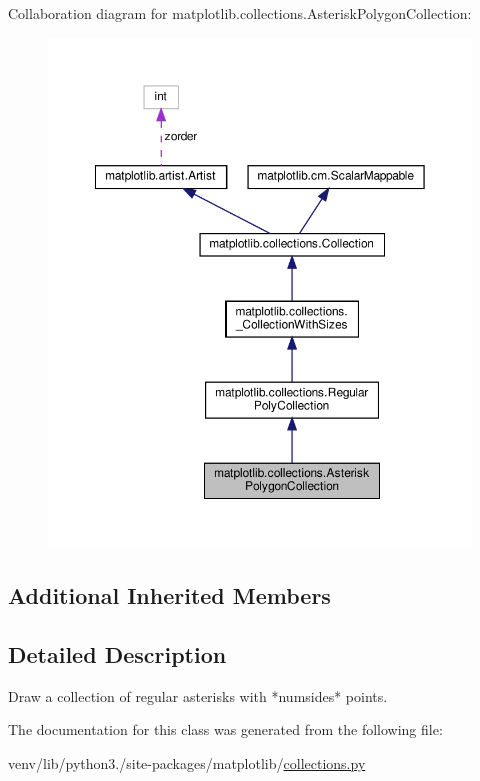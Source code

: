 Collaboration diagram for matplotlib.\+collections.\+Asterisk\+Polygon\+Collection\+:
\nopagebreak
\begin{figure}[H]
\begin{center}
\leavevmode
\includegraphics[width=350pt]{classmatplotlib_1_1collections_1_1AsteriskPolygonCollection__coll__graph}
\end{center}
\end{figure}
\subsection*{Additional Inherited Members}


\subsection{Detailed Description}
\begin{DoxyVerb}Draw a collection of regular asterisks with *numsides* points.\end{DoxyVerb}
 

The documentation for this class was generated from the following file\+:\begin{DoxyCompactItemize}
\item 
venv/lib/python3./site-\/packages/matplotlib/\hyperlink{collections_8py}{collections.\+py}\end{DoxyCompactItemize}
